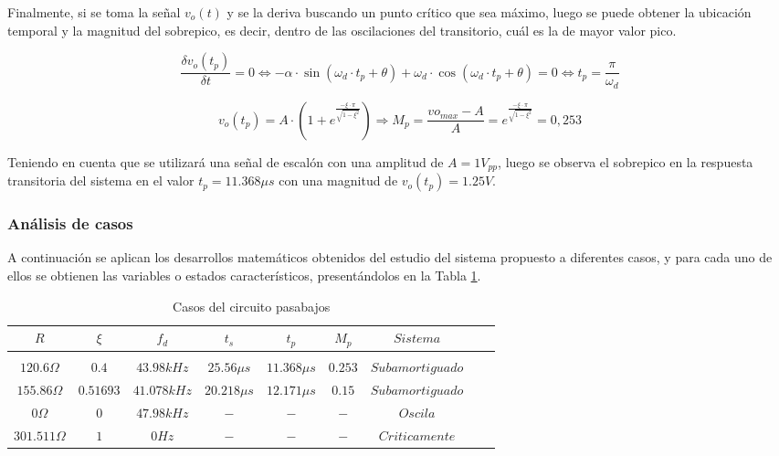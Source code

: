 Finalmente, si se toma la se\~nal $v_o(t)$ y se la deriva buscando un punto cr\'itico que sea m\'aximo, luego se puede obtener la ubicaci\'on temporal y la magnitud del sobrepico,
es decir, dentro de las oscilaciones del transitorio, cu\'al es la de mayor valor pico.

\begin{equation}
    \frac{\delta v_o (t_p)}{\delta t} = 0 
    \Leftrightarrow
    - \alpha \cdot \sin{(\omega_d \cdot t_p + \theta)} + \omega_d \cdot \cos{(\omega_d \cdot t_p + \theta)} = 0
    \Leftrightarrow
    t_p = \frac{\pi}{\omega_d}
\end{equation}

\begin{equation}
    v_o(t_p) = A  \cdot (1 + e^{\frac{- \xi \cdot \pi}{\sqrt{1 - \xi^{2}}}})
    \Rightarrow 
    M_p = \frac{vo_{max} - A}{A} = e^{\frac{- \xi \cdot \pi}{\sqrt{1 - \xi^{2}}}} = 0,253
\end{equation}

Teniendo en cuenta que se utilizar\'a una se\~nal de escal\'on con una amplitud de $A = 1V_{pp}$, luego se observa el sobrepico en la respuesta transitoria
del sistema en el valor $t_p = 11.368 \mu s$ con una magnitud de $v_o(t_p) = 1.25 V$.

\subsubsection{An\'alisis de casos}
A continuaci\'on se aplican los desarrollos matem\'aticos obtenidos del estudio del sistema propuesto a diferentes casos, y para cada uno de ellos
se obtienen las variables o estados caracter\'isticos, present\'andolos en la Tabla \ref{tab:tabla_casos_pasabajo}.

\begin{table}[H]
    \centering
    \begin{tabular}{c c c c c c c c c}
        $R$ & $\xi$ & $f_d$ & $t_s$ & $t_p$ & $M_p$ & $Sistema$ \\
        \hline \\
        $120.6 \Omega$ & $0.4$ & $43.98kHz$ & $25.56 \mu s$ & $11.368 \mu s$ & $0.253$ & $Subamortiguado$ \\
        $155.86 \Omega$ & $0.51693$ & $41.078kHz$ & $20.218 \mu s$ & $12.171 \mu s$ & $0.15$ & $Subamortiguado$ \\
        $0 \Omega$ & $0$ & $47.98kHz$ & $-$ & $-$ & $-$ & $Oscila$ \\
        $301.511 \Omega$ & $1$ & $0Hz$ & $-$ & $-$ & $-$ & $Criticamente        $ \\
        \hline
    \end{tabular}
    \caption{Casos del circuito pasabajos}
    \label{tab:tabla_casos_pasabajo}
\end{table}

